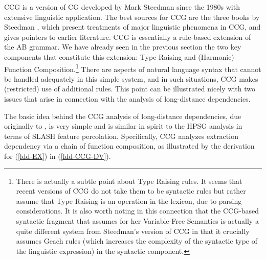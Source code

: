 \documentclass[output=paper]{langsci/langscibook}
\begin{document}
CCG is a version of CG developed by Mark Steedman since the 1980s with
extensive linguistic application. The best sources for CCG are the
three books by Steedman \citep{Steedman97a,Steedman2000a-u,steedman2012},
which present treatments of major linguistic phenomena in CCG, and
gives pointers to earlier literature. CCG is essentially a rule-based
extension of the AB grammar. We have already seen in the previous
section the two key components that constitute this extension: Type
Raising and (Harmonic) Function Composition.\footnote{There is
actually a subtle point about Type Raising rules. It seems that recent
versions of CCG \citep{steedman2012} do not take them to be syntactic rules
but rather assume that Type Raising is an operation in the lexicon,
due to parsing considerations. It is also worth noting in this
connection that the CCG-based syntactic fragment that
\citet{jacobson1999a,jacobson2000a} assumes for her Variable-Free Semantics
is actually a quite different system from Steedman's version of CCG in
that it crucially assumes Geach rules (which increases the complexity
of the syntactic type of the linguistic expression) in the syntactic
component.} There are aspects of natural language syntax that cannot
be handled adequately in this simple system, and in such situations,
CCG makes (restricted) use of additional rules. This point can be
illustrated nicely with two issues that arise in connection with the
analysis of long-distance dependencies.

The basic idea behind the CCG analysis of long-distance dependencies,
due originally to \citet{AS82a}, is very simple and is similar in spirit to
the HPSG analysis in terms of SLASH feature percolation. Specifically,
CCG analyzes extraction dependency via a chain of function
composition, as illustrated by the derivation for (\ref{ldd-EX}) in (\ref{ldd-CCG-DV}).
\end{document}
